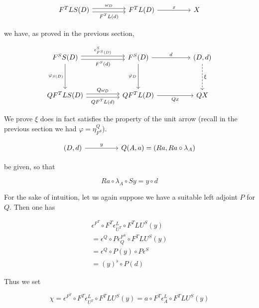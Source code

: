 \documentclass[10pt, oneside]{article}
\begin{document}
\[\begin{tikzcd}[ampersand replacement=\&]
	{F^T L S (D)} \&\& {F^T L (D)} \&\& X
	\arrow["{\omega_D}", shift left, from=1-1, to=1-3]
	\arrow["{F^T L(d)}"', shift right, from=1-1, to=1-3]
	\arrow["x", from=1-3, to=1-5]
\end{tikzcd}\]

\noindent we have, as proved in the previous section,

\[\begin{tikzcd}[ampersand replacement=\&]
	{F^S S (D)} \&\& {F^S (D)} \&\& {(D, d) } \\
	\\
	{Q F^T L S(D)} \&\& {Q F^T L(D)} \&\& QX
	\arrow["{\epsilon^S_{F^S (D)}}", shift left, from=1-1, to=1-3]
	\arrow["{F^S (d)}"', shift right, from=1-1, to=1-3]
	\arrow["d", from=1-3, to=1-5]
	\arrow["{\varphi_{S(D)}}"', from=1-1, to=3-1]
	\arrow["{\varphi_D}"', from=1-3, to=3-3]
	\arrow["{Q \omega_D}", shift left, from=3-1, to=3-3]
	\arrow["{Q F^T L (d)}"', shift right, from=3-1, to=3-3]
	\arrow["Qx"', from=3-3, to=3-5]
	\arrow["\xi", dashed, from=1-5, to=3-5]
\end{tikzcd}\]

We prove $\xi$ does in fact satisfies the property of the unit arrow (recall in the previous section we had $\varphi = \eta^Q_{F^S}$).

\[\begin{tikzcd}[ampersand replacement=\&]
	{(D, d)} \&\& {Q(A, a) = (Ra, Ra \circ \lambda_A)}
	\arrow["y", from=1-1, to=1-3]
\end{tikzcd}\]

\noindent be given, so that

$$Ra \circ \lambda_A \circ Sy = y \circ d$$

For the sake of intuition, let us again suppose we have a suitable left adjoint $P$ for $Q$. Then one has

\begin{align*}
    \epsilon^{F^T} \circ F^T \epsilon^L_{U^T} \circ F^T L U^S (y)
    \\ = \epsilon^{Q} \circ P \epsilon^{F^S}_{Q} \circ F^T L U^S (y) 
    \\ = \epsilon^{Q} \circ P (y) \circ P \epsilon^S
    \\ = (y)^\flat \circ P(d)
\end{align*}

Thus we set

$$\chi = \epsilon^{F^T} \circ F^T \epsilon^L_{U^T} \circ F^T L U^S (y) = a \circ F^T \epsilon^L_{A} \circ F^T L U^S (y) $$
\end{document}
